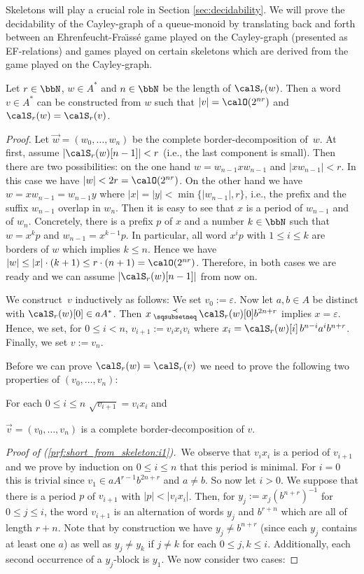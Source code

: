 \documentclass[a4paper,numberwithinsect,USenglish]{lipics-v2018}
\theoremstyle{plain}
\theoremstyle{remark}
\newcommand{\presuf}{\mathbin{\substack{{\prec}\\{\sqsubsetneq}}}}
\renewcommand{\root}[1]{\sqrt{#1}}
\renewcommand{\epsilon}{\varepsilon}
\begin{document}
Skeletons will play a crucial role in Section \ref{sec:decidability}. 
We will prove the decidability of the Cayley-graph of a queue-monoid by  translating back and forth between 
an Ehrenfeucht-Fra\"{\i}ss\'{e} game played on the Cayley-graph (presented as EF-relations) and games played on certain skeletons which are derived from the game played on the Cayley-graph. 

\begin{lemma}\label{lem:short_from_skeleton}
	Let $r\in\bbN$, $w\in A^*$ and $n\in\bbN$ be the length of $\calS_r(w)$. Then a word $v\in A^*$ can be constructed from $w$ such that $|v|=\calO(2^{nr})$ and $\calS_r(w)=\calS_r(v)$.
\end{lemma}
\begin{proof}
	Let $\vec{w}=(w_0,\dots,w_n)$ be the complete border-decomposition of~$w$. At first, assume $|\calS_r(w)[n-1]|<r$ (i.e., the last component is small). Then there are two possibilities: on the one hand $w=w_{n-1}xw_{n-1}$ and $|xw_{n-1}|<r$. In this case we have $|w|<2r=\calO(2^{nr})$. On the other hand we have $w=xw_{n-1}=w_{n-1}y$ where $|x|=|y|<\min\{|w_{n-1}|,r\}$, i.e., the prefix and the suffix $w_{n-1}$ overlap in $w_n$. Then it is easy to see that $x$ is a period of $w_{n-1}$ and of $w_n$. Concretely, there is a prefix $p$ of $x$ and a number $k\in\bbN$ such that $w=x^kp$ and $w_{n-1}=x^{k-1}p$. In particular, all word $x^ip$ with $1\leq i\leq k$ are borders of $w$ which implies $k\leq n$. Hence we have $|w|\leq|x|\cdot(k+1)\leq r\cdot(n+1)=\calO(2^{nr})$. Therefore, in both cases we are ready and we can assume $|\calS_r(w)[n-1]|$ from now on.
	
	We construct~$v$ inductively as follows: We set $v_0:=\epsilon$. Now let $a,b\in A$ be distinct with $\calS_r(w)[0]\in aA^*$. Then $x\presuf\calS_r(w)[0]b^{2n+r}$ implies $x=\epsilon$. Hence, we set, for $0\leq i<n$, $v_{i+1}:=v_ix_iv_i$ where $x_i=\calS_r(w)[i]\,b^{n-i}a^ib^{n+r}$. Finally, we set $v:=v_{n}$.
	
	Before we can prove $\calS_r(w)=\calS_r(v)$ we need to prove the following two properties of $(v_0,\dots,v_n)$:
	\begin{alphaenumerate}
		\item For each $0\leq i\leq n$ $\root{v_{i+1}}=v_ix_i$ and\label{prf:short_from_skeleton:i1}
		\item $\vec{v}=(v_0,\dots,v_{n})$ is a complete border-decomposition of $v$.\label{prf:short_from_skeleton:i2}
	\end{alphaenumerate}
	\emph{Proof of (\ref{prf:short_from_skeleton:i1}).}\ We observe that $v_ix_i$ is a period of $v_{i+1}$ and we prove by induction on $0\leq i\leq n$ that this period is minimal. For $i=0$ this is trivial since $v_1\in aA^{r-1}b^{2n+r}$ and $a\neq b$. So now let $i>0$. We suppose that there is a period $p$ of $v_{i+1}$ with $|p|<|v_ix_i|$. Then, for $y_j:=x_j(b^{n+r})^{-1}$ for $0\leq j\leq i$, the word $v_{i+1}$ is an alternation of words $y_j$ and $b^{r+n}$ which are all of length $r+n$. Note that by construction we have $y_{j}\neq b^{n+r}$ (since each $y_{j}$ contains at least one $a$) as well as $y_{j}\neq y_{k}$ if $j\neq k$ for each $0\leq j,k\leq i$. Additionally, each second occurrence of a $y_j$-block is $y_1$. We now consider two cases:
	

\end{proof}
\end{document}
